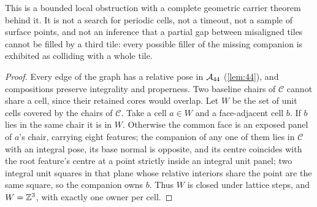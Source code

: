 This is a bounded local obstruction with a complete geometric carrier theorem behind it. It is
not a search for periodic cells, not a timeout, not a sample of surface points, and not an
inference that a partial gap between misaligned tiles cannot be filled by a third tile: every
possible filler of the missing companion is exhibited as colliding with a whole tile.


\begin{proof}
Every edge of the graph has a relative pose in $\mathcal{A}_{44}$ (\cref{lem:44}), and compositions preserve
integrality and properness. Two baseline chairs of $\mathcal{C}$ cannot share a cell, since their
retained cores would overlap. Let $W$ be the set of unit cells covered by the chairs of
$\mathcal{C}$. Take a cell $a\in W$ and a face-adjacent cell $b$. If $b$ lies in the same chair it is
in $W$. Otherwise the common face is an exposed panel of $a$'s chair, carrying eight features;
the companion of any one of them lies in $\mathcal{C}$ with an integral pose, its base normal is
opposite, and its centre coincides with the root feature's centre at a point strictly inside an
integral unit panel; two integral unit squares in that plane whose relative interiors share the
point are the same square, so the companion owns $b$. Thus $W$ is closed under lattice steps, and
$W=\mathbb{Z}^3$, with exactly one owner per cell.
\end{proof}


